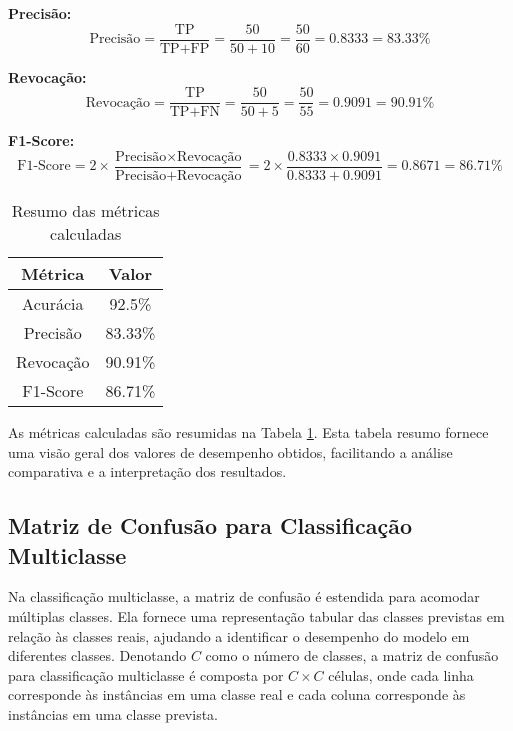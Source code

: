 \textbf{Precisão:}
\[ \text{Precisão} = \frac{\text{TP}}{\text{TP} + \text{FP}} = \frac{50}{50 + 10} = \frac{50}{60} = 0.8333 = 83.33\% \]

\textbf{Revocação:}
\[ \text{Revocação} = \frac{\text{TP}}{\text{TP} + \text{FN}} = \frac{50}{50 + 5} = \frac{50}{55} = 0.9091 = 90.91\% \]

\textbf{F1-Score:}
\[ \text{F1-Score} = 2 \times \frac{\text{Precisão} \times \text{Revocação}}{\text{Precisão} + \text{Revocação}} = 2 \times \frac{0.8333 \times 0.9091}{0.8333 + 0.9091} = 0.8671 = 86.71\% \]

\begin{table}[h]
\centering
\caption{Resumo das métricas calculadas}
\label{tab:resumo_metricas}
\begin{tabular}{c|c}
\hline
\textbf{Métrica} & \textbf{Valor} \\ \hline
Acurácia & 92.5\% \\ \hline
Precisão & 83.33\% \\ \hline
Revocação & 90.91\% \\ \hline
F1-Score & 86.71\% \\ \hline
\end{tabular}
\end{table}

As métricas calculadas são resumidas na Tabela \ref{tab:resumo_metricas}. Esta tabela resumo fornece uma visão geral dos valores de desempenho obtidos, facilitando a análise comparativa e a interpretação dos resultados.


\subsection{Matriz de Confusão para Classificação Multiclasse}

Na classificação multiclasse, a matriz de confusão é estendida para acomodar múltiplas classes. Ela fornece uma representação tabular das classes previstas em relação às classes reais, ajudando a identificar o desempenho do modelo em diferentes classes. Denotando \(C\) como o número de classes, a matriz de confusão para classificação multiclasse é composta por \(C \times C\) células, onde cada linha corresponde às instâncias em uma classe real e cada coluna corresponde às instâncias em uma classe prevista.

